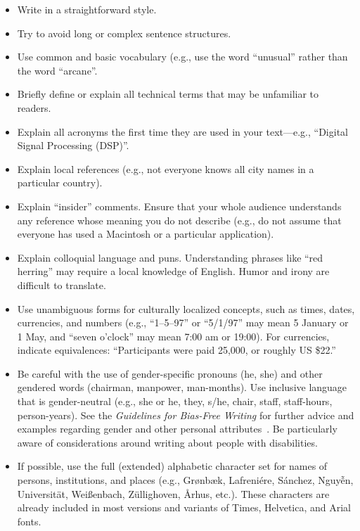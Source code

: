 \documentclass{sigchi}
\begin{document}
\begin{itemize}
\item Write in a straightforward style.
\item Try to avoid long or complex sentence structures.
\item Use common and basic vocabulary (e.g., use the word ``unusual'' rather than the word ``arcane''.
\item Briefly define or explain all technical terms that may be
  unfamiliar to readers.
\item Explain all acronyms the first time they are used in your
  text---e.g., ``Digital Signal Processing (DSP)''.
\item Explain local references (e.g., not everyone knows all city
  names in a particular country).
\item Explain ``insider'' comments. Ensure that your whole audience
  understands any reference whose meaning you do not describe (e.g.,
  do not assume that everyone has used a Macintosh or a particular
  application).
\item Explain colloquial language and puns. Understanding phrases like
  ``red herring'' may require a local knowledge of English.  Humor and
  irony are difficult to translate.
\item Use unambiguous forms for culturally localized concepts, such as
  times, dates, currencies, and numbers (e.g., ``1--5--97'' or
  ``5/1/97'' may mean 5 January or 1 May, and ``seven o'clock'' may
  mean 7:00 am or 19:00). For currencies, indicate equivalences:
  ``Participants were paid {\selectfont \textwon}
  25,000, or roughly US \$22.''
\item Be careful with the use of gender-specific pronouns (he, she)
  and other gendered words (chairman, manpower, man-months). Use
  inclusive language that is gender-neutral (e.g., she or he, they,
  s/he, chair, staff, staff-hours, person-years). See the
  \textit{Guidelines for Bias-Free Writing} for further advice and
  examples regarding gender and other personal
  attributes~\cite{Schwartz:1995:GBF}. Be particularly aware of
  considerations around writing about people with disabilities.
\item If possible, use the full (extended) alphabetic character set
  for names of persons, institutions, and places (e.g.,
  Gr{\o}nb{\ae}k, Lafreni\'ere, S\'anchez, Nguy{\~{\^{e}}}n,
  Universit{\"a}t, Wei{\ss}enbach, Z{\"u}llighoven, \r{A}rhus, etc.).
  These characters are already included in most versions and variants
  of Times, Helvetica, and Arial fonts.
\end{itemize}
\end{document}
